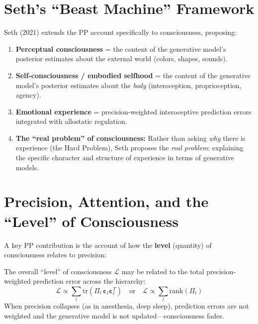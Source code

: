 \documentclass[11pt,a4paper]{report}
\begin{document}
\section{Seth's ``Beast Machine'' Framework}

Seth (2021) extends the PP account specifically to consciousness, proposing:

\begin{modelbox}
\begin{enumerate}[leftmargin=1.5em]
  \item \textbf{Perceptual consciousness} = the content of the generative model's posterior estimates about the external world (colors, shapes, sounds).
  \item \textbf{Self-consciousness / embodied selfhood} = the content of the generative model's posterior estimates about the \emph{body} (interoception, proprioception, agency).
  \item \textbf{Emotional experience} = precision-weighted interoceptive prediction errors integrated with allostatic regulation.
  \item \textbf{The ``real problem'' of consciousness:} Rather than asking \emph{why} there is experience (the Hard Problem), Seth proposes the \emph{real problem}: explaining the specific character and structure of experience in terms of generative models.
\end{enumerate}
\end{modelbox}

\section{Precision, Attention, and the ``Level'' of Consciousness}

A key PP contribution is the account of how the \textbf{level} (quantity) of consciousness relates to precision:

\begin{mathbox}
\vspace{-6pt}
The overall ``level'' of consciousness $\mathcal{L}$ may be related to the total precision-weighted prediction error across the hierarchy:
\[
  \mathcal{L} \propto \sum_l \text{tr}\!\left(\Pi_l\, \boldsymbol{\varepsilon}_l \boldsymbol{\varepsilon}_l^T\right) \quad \text{or} \quad \mathcal{L} \propto \sum_l \text{rank}(\Pi_l)
\]
When precision collapses (as in anesthesia, deep sleep), prediction errors are not weighted and the generative model is not updated---consciousness fades.
\vspace{-4pt}
\end{mathbox}
\end{document}
